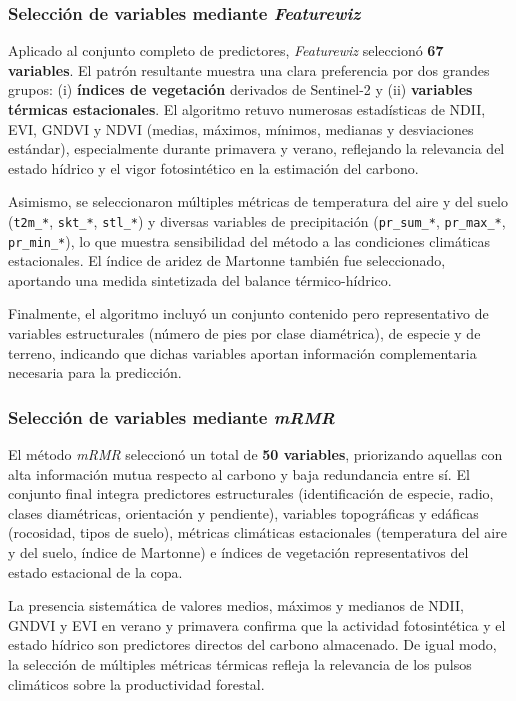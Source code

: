\subsubsection{Selección de variables mediante \textit{Featurewiz}}

Aplicado al conjunto completo de predictores, \textit{Featurewiz} seleccionó \textbf{67 variables}. El patrón resultante muestra una clara preferencia por dos grandes grupos: (i) \textbf{índices de vegetación} derivados de Sentinel-2 y (ii) \textbf{variables térmicas estacionales}. El algoritmo retuvo numerosas estadísticas de NDII, EVI, GNDVI y NDVI (medias, máximos, mínimos, medianas y desviaciones estándar), especialmente durante primavera y verano, reflejando la relevancia del estado hídrico y el vigor fotosintético en la estimación del carbono.

Asimismo, se seleccionaron múltiples métricas de temperatura del aire y del suelo (\texttt{t2m\_*}, \texttt{skt\_*}, \texttt{stl\_*}) y diversas variables de precipitación (\texttt{pr\_sum\_*}, \texttt{pr\_max\_*}, \texttt{pr\_min\_*}), lo que muestra sensibilidad del método a las condiciones climáticas estacionales. El índice de aridez de Martonne también fue seleccionado, aportando una medida sintetizada del balance térmico-hídrico.

Finalmente, el algoritmo incluyó un conjunto contenido pero representativo de variables estructurales (número de pies por clase diamétrica), de especie y de terreno, indicando que dichas variables aportan información complementaria necesaria para la predicción.

\subsubsection{Selección de variables mediante \textit{mRMR}}

El método \textit{mRMR} seleccionó un total de \textbf{50 variables}, priorizando aquellas con alta información mutua respecto al carbono y baja redundancia entre sí. El conjunto final integra predictores estructurales (identificación de especie, radio, clases diamétricas, orientación y pendiente), variables topográficas y edáficas (rocosidad, tipos de suelo), métricas climáticas estacionales (temperatura del aire y del suelo, índice de Martonne) e índices de vegetación representativos del estado estacional de la copa.

La presencia sistemática de valores medios, máximos y medianos de NDII, GNDVI y EVI en verano y primavera confirma que la actividad fotosintética y el estado hídrico son predictores directos del carbono almacenado. De igual modo, la selección de múltiples métricas térmicas refleja la relevancia de los pulsos climáticos sobre la productividad forestal.

